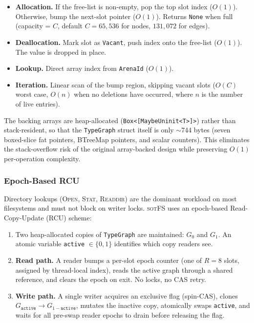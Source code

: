 \documentclass[11pt,a4paper]{article}
\theoremstyle{definition}
\newcommand{\sotfs}{\textsc{sotFS}}
\begin{document}
\begin{itemize}[nosep]
  \item \textbf{Allocation.}  If the free-list is non-empty, pop the top
        slot index ($O(1)$).  Otherwise, bump the next-slot pointer ($O(1)$).
        Returns \texttt{None} when full (capacity = $C$, default $C = 65{,}536$
        for nodes, $131{,}072$ for edges).
  \item \textbf{Deallocation.}  Mark slot as \texttt{Vacant}, push index onto
        the free-list ($O(1)$).  The value is dropped in place.
  \item \textbf{Lookup.}  Direct array index from \texttt{ArenaId} ($O(1)$).
  \item \textbf{Iteration.}  Linear scan of the bump region, skipping vacant
        slots ($O(C)$ worst case, $O(n)$ when no deletions have occurred,
        where $n$ is the number of live entries).
\end{itemize}

The backing arrays are heap-allocated (\texttt{Box<[MaybeUninit<T>]>}) rather
than stack-resident, so that the \texttt{TypeGraph} struct itself is only
$\sim$744 bytes (seven boxed-slice fat pointers, BTreeMap pointers, and scalar
counters).  This eliminates the stack-overflow risk of the original
array-backed design while preserving $O(1)$ per-operation complexity.

\subsubsection{Epoch-Based RCU}

Directory lookups (\textsc{Open}, \textsc{Stat}, \textsc{Readdir}) are the
dominant workload on most filesystems and must not block on writer locks.
\sotfs{} uses an epoch-based Read-Copy-Update (RCU) scheme:

\begin{enumerate}[nosep]
  \item Two heap-allocated copies of \texttt{TypeGraph} are maintained:
        $G_0$ and $G_1$.  An atomic variable \texttt{active} $\in \{0, 1\}$
        identifies which copy readers see.
  \item \textbf{Read path.}  A reader bumps a per-slot epoch counter
        (one of $R = 8$ slots, assigned by thread-local index), reads the
        active graph through a shared reference, and clears the epoch on exit.
        No locks, no CAS retry.
  \item \textbf{Write path.}  A single writer acquires an exclusive flag
        (spin-CAS), clones $G_{\texttt{active}} \to G_{1-\texttt{active}}$,
        mutates the inactive copy, atomically swaps \texttt{active}, and
        waits for all pre-swap reader epochs to drain before releasing the
        flag.
\end{enumerate}
\end{document}
